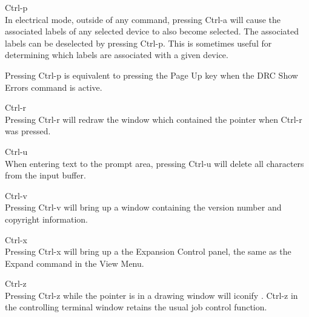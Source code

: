 \begin{description}
\item{\kb Ctrl-p}\\
In electrical mode, outside of any command, pressing {\kb Ctrl-a} will
cause the associated labels of any selected device to also become
selected.  The associated labels can be deselected by pressing {\kb
Ctrl-p}.  This is sometimes useful for determining which labels are
associated with a given device.

Pressing {\kb Ctrl-p} is equivalent to pressing the {\kb Page Up} key
when the DRC {\cb Show Errors} command is active.

\item{\kb Ctrl-r}\\
Pressing {\kb Ctrl-r} will redraw the window which contained the
pointer when {\kb Ctrl-r} was pressed.

\item{\kb Ctrl-u}\\
When entering text to the prompt area, pressing {\kb Ctrl-u} will
delete all characters from the input buffer.

\item{\kb Ctrl-v}\\
Pressing {\kb Ctrl-v} will bring up a window containing the {\Xic}
version number and copyright information.

\item{\kb Ctrl-x}\\
Pressing {\kb Ctrl-x} will bring up a the {\cb Expansion Control}
panel, the same as the {\cb Expand} command in the {\cb View Menu}.

\item{\kb Ctrl-z}\\
Pressing {\kb Ctrl-z} while the pointer is in a drawing window will
iconify {\Xic}.  {\kb Ctrl-z} in the controlling terminal window
retains the usual job control function.

\end{description}

